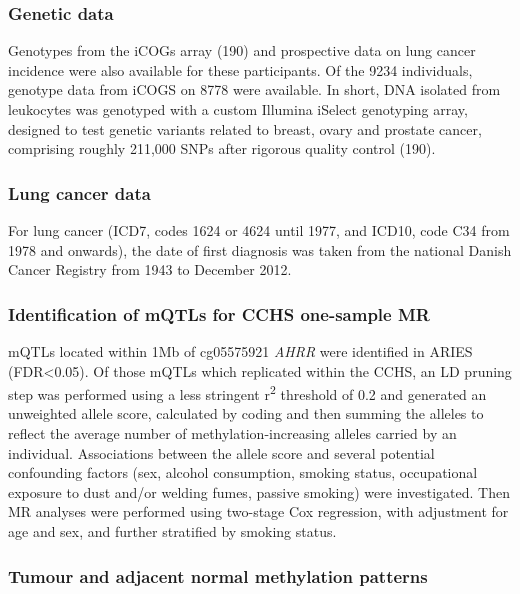 \documentclass[11pt,oneside]{bristolthesis}
\begin{document}
\hypertarget{genetic-data}{%
\subsubsection{Genetic data}\label{genetic-data}}

Genotypes from the iCOGs array (190) and prospective data on lung cancer incidence were also available for these participants. Of the 9234 individuals, genotype data from iCOGS on 8778 were available. In short, DNA isolated from leukocytes was genotyped with a custom Illumina iSelect genotyping array, designed to test genetic variants related to breast, ovary and prostate cancer, comprising roughly 211,000 SNPs after rigorous quality control (190).

\hypertarget{lung-cancer-data}{%
\subsubsection{Lung cancer data}\label{lung-cancer-data}}

For lung cancer (ICD7, codes 1624 or 4624 until 1977, and ICD10, code C34 from 1978 and onwards), the date of first diagnosis was taken from the national Danish Cancer Registry from 1943 to December 2012.

\hypertarget{identification-of-mqtls-for-cchs-one-sample-mr}{%
\subsubsection{Identification of mQTLs for CCHS one-sample MR}\label{identification-of-mqtls-for-cchs-one-sample-mr}}

mQTLs located within 1Mb of cg05575921 \emph{AHRR} were identified in ARIES (FDR\textless0.05). Of those mQTLs which replicated within the CCHS, an LD pruning step was performed using a less stringent r\textsuperscript{2} threshold of 0.2 and generated an unweighted allele score, calculated by coding and then summing the alleles to reflect the average number of methylation-increasing alleles carried by an individual. Associations between the allele score and several potential confounding factors (sex, alcohol consumption, smoking status, occupational exposure to dust and/or welding fumes, passive smoking) were investigated. Then MR analyses were performed using two-stage Cox regression, with adjustment for age and sex, and further stratified by smoking status.

\hypertarget{lc-heathly-v-normal-methods}{%
\subsubsection{Tumour and adjacent normal methylation patterns}\label{lc-heathly-v-normal-methods}}
\end{document}
